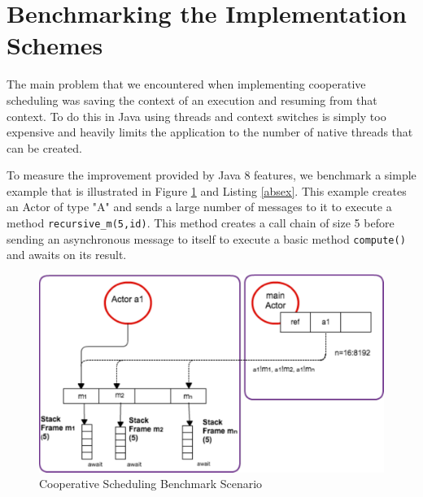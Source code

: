 \section{Benchmarking the Implementation Schemes}
\label{bench}
The main problem that we encountered  when implementing cooperative scheduling was saving the context of an execution and resuming from that context. To do this in Java using threads and context switches is simply too expensive and heavily limits the application to the number of native threads that can be created. 

To measure the improvement provided by Java 8 features, we benchmark a
simple example that is illustrated in Figure \ref{sf} and Listing \ref{absex}. 
This example creates an Actor of type "A" and sends a large number of messages to it to execute a method \lstinline|recursive_m(5,id)|. This method creates a call chain of size 5 before sending an asynchronous message to itself to execute a basic method \lstinline|compute()| and awaits on its result.


\begin{figure}
	\label{sf}
	\centering
	\includegraphics[scale=0.6]{scenario}
	\caption{Cooperative Scheduling Benchmark Scenario}
\end{figure}


